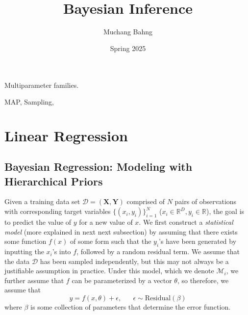 \documentclass{article}
\begin{document}
\title{Bayesian Inference}
\author{Muchang Bahng}
\date{Spring 2025}

\maketitle
\tableofcontents
\pagebreak

 
 

Multiparameter families. 

MAP, Sampling, 

\section{Linear Regression}

  \subsection{Bayesian Regression: Modeling with Hierarchical Priors}

    Given a training data set $\mathcal{D} = (\mathbf{X}, \mathbf{Y})$ comprised of $N$ pairs of observations with corresponding target variables $\{(x_i, y_i)\}_{i=1}^N$ ($x_i \in \mathbb{R}^D, y_i \in \mathbb{R}$), the goal is to predict the value of $y$ for a new value of $x$. We first construct a \textit{statistical model} (more explained in next next subsection) by assuming that there exists some function $f(x)$ of some form such that the $y_i$'s have been generated by inputting the $x_i$'s into $f$, followed by a random residual term. We assume that the data $\mathcal{D}$ has been sampled independently, but this may not always be a justifiable assumption in practice. Under this model, which we denote $\mathcal{M}_i$, we further assume that $f$ can be parameterized by a vector $\theta$, so therefore, we assume that
    \begin{equation}
      y = f(x, \theta) + \epsilon, \;\;\;\;\;\; \epsilon \sim \text{Residual} (\beta)
    \end{equation}
    where $\beta$ is some collection of parameters that determine the error function.
\end{document}
